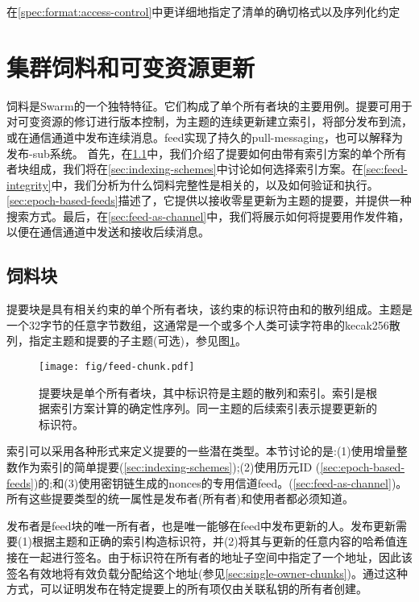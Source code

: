 在\ref{spec:format:access-control}中更详细地指定了清单的确切格式以及序列化约定



\section{集群饲料和可变资源更新\statusyellow}\label{sec:feeds}

\green{}

饲料是Swarm的一个独特特征。它们构成了单个所有者块的主要用例。提要可用于对可变资源的修订进行版本控制，为主题的连续更新建立索引，将部分发布到流，或在通信通道中发布连续消息。feed实现了持久的pull-messaging，也可以解释为发布-sub系统。
首先，在\ref{sec:feed-chunks}中，我们介绍了提要如何由带有索引方案的单个所有者块组成，我们将在\ref{sec:indexing-schemes}中讨论如何选择索引方案。在\ref{sec:feed-integrity}中，我们分析为什么饲料完整性是相关的，以及如何验证和执行。\ref{sec:epoch-based-feeds}描述了，它提供以接收零星更新为主题的提要，并提供一种搜索方式。最后，在\ref{sec:feed-as-channel}中，我们将展示如何将提要用作发件箱，以便在通信通道中发送和接收后续消息。


\subsection{饲料块\statusyellow}\label{sec:feed-chunks}

提要块是具有相关约束的单个所有者块，该约束的标识符由和的散列组成。主题是一个32字节的任意字节数组，这通常是一个或多个人类可读字符串的kecak256散列，指定主题和提要的子主题(可选)，参见图\ref{fig:feed-chunk}。 


\begin{figure}[htbp]
\centering
\texttt{[image: fig/feed-chunk.pdf]}
\caption[饲料块\statusgreen]{提要块是单个所有者块，其中标识符是主题的散列和索引。索引是根据索引方案计算的确定性序列。同一主题的后续索引表示提要更新的标识符。}
\label{fig:feed-chunk}
\end{figure}

索引可以采用各种形式来定义提要的一些潜在类型。本节讨论的是:(1)使用增量整数作为索引的简单提要(\ref{sec:indexing-schemes});(2)使用历元ID (\ref{sec:epoch-based-feeds})的;和(3)使用密钥链生成的nonces的专用信道feed。(\ref{sec:feed-as-channel})。
所有这些提要类型的统一属性是发布者(所有者)和使用者都必须知道。

发布者是feed块的唯一所有者，也是唯一能够在feed中发布更新的人。发布更新需要(1)根据主题和正确的索引构造标识符，并(2)将其与更新的任意内容的哈希值连接在一起进行签名。由于标识符在所有者的地址子空间中指定了一个地址，因此该签名有效地将有效负载分配给这个地址(参见\ref{sec:single-owner-chunks})。通过这种方式，可以证明发布在特定提要上的所有项仅由关联私钥的所有者创建。

